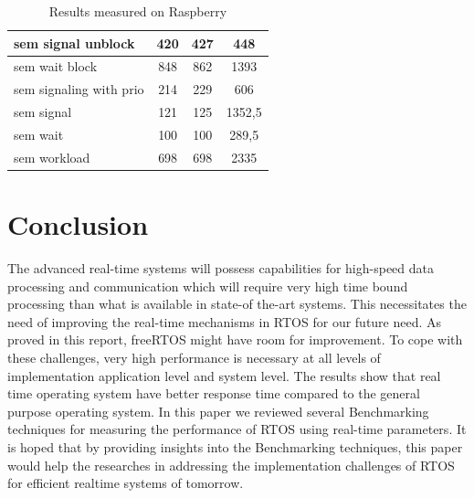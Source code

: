 \documentclass[conference]{IEEEtran}
\begin{document}
\begin{table}[htbp]
\begin{center}
\begin{tabular}{|l|c|c|c|}
sem signal unblock      & 420                                    & 427                                       & 448                                    \\ \hline
sem wait block          & 848                                    & 862                                       & 1393                                   \\ \hline
sem signaling with prio & 214                                    & 229                                       & 606                                    \\ \hline
sem signal              & 121                                    & 125                                       & 1352,5                                 \\ \hline
sem wait                & 100                                    & 100                                       & 289,5                                  \\ \hline
sem workload                & 698                                    & 698                                       & 2335                                 \\ \hline
\end{tabular}
\end{center}
    \label{tab:results}
    \caption{Results measured on Raspberry}
    \vspace{-1em}
\end{table}

\vspace{-4.00mm}

\section{Conclusion}

The advanced real-time systems will possess
capabilities for high-speed data processing and
communication which will require very high time
bound processing than what is available in state-of
the-art systems. This necessitates the need of
improving the real-time mechanisms in RTOS for our
future need. As proved in this report, freeRTOS might 
have room for improvement. To cope with  these 
challenges, very high  performance is necessary at all levels of
implementation application level and system level. 
The results show that real time operating system have better response
time compared to the general purpose operating system. 
In this paper we reviewed several Benchmarking
techniques for measuring the performance of RTOS
using real-time parameters. It is hoped that by
providing insights into the Benchmarking techniques,
this paper would help the researches in addressing the
implementation challenges of RTOS for efficient realtime systems of tomorrow.
\end{document}
